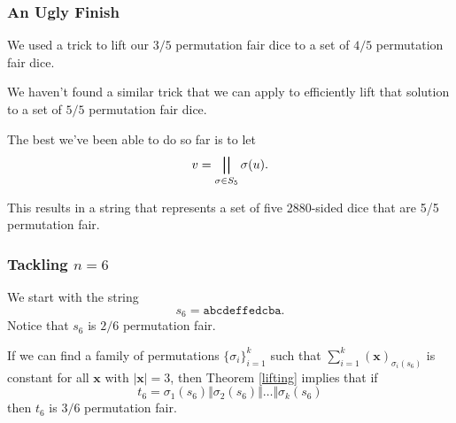 \documentclass[aspectratio=169]{beamer}
\begin{document}
\begin{frame}[triangle=siiblue]
\frametitle{An Ugly Finish}
We used a trick to lift our $3/5$ permutation fair dice to a set of $4/5$ permutation fair dice.

\vfill

We haven't found a similar trick that we can apply to efficiently lift that solution to a set of $5/5$ permutation fair dice.

\vfill

The best we've been able to do so far is to let
\begin{equation*}
v = \bigparallel_{\sigma \in S_5} \sigma(u).
\end{equation*}

\vfill

This results in a string that represents a set of five 2880-sided dice that are 5/5 permutation fair.
\end{frame}

\begin{frame}[triangle=siiblue]
\frametitle{Tackling $n=6$}
We start with the string
\begin{equation*}
s_6 = \texttt{abcdeffedcba}.
\end{equation*}
Notice that $s_6$ is $2/6$ permutation fair.

\vfill

If we can find a family of permutations $\{\sigma_i\}_{i=1}^k$ such that $\sum_{i=1}^k (\mathbf{x})_{\sigma_i(s_6)}$ is constant for all $\mathbf{x}$ with $|\mathbf{x}| = 3$, then Theorem \ref{lifting} implies that if
\begin{equation*}
t_6 = \sigma_1(s_6) \Vert \sigma_2(s_6) \Vert \ldots \Vert \sigma_k(s_6)
\end{equation*}
then $t_6$ is $3/6$ permutation fair. 
\end{frame}
\end{document}
